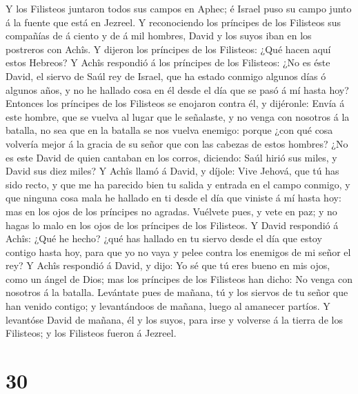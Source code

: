  Y los Filisteos juntaron todos sus campos en Aphec; é
Israel puso su campo junto á la fuente que está en Jezreel. 
Y reconociendo los príncipes de los Filisteos sus compañías de á ciento
y de á mil hombres, David y los suyos iban en los postreros con Achîs.
 Y dijeron los príncipes de los Filisteos: ¿Qué hacen aquí
estos Hebreos? Y Achîs respondió á los príncipes de los Filisteos: ¿No
es éste David, el siervo de Saúl rey de Israel, que ha estado conmigo
algunos días ó algunos años, y no he hallado cosa en él desde el día que
se pasó á mí hasta hoy?  Entonces los príncipes de los
Filisteos se enojaron contra él, y dijéronle: Envía á este hombre, que
se vuelva al lugar que le señalaste, y no venga con nosotros á la
batalla, no sea que en la batalla se nos vuelva enemigo: porque ¿con qué
cosa volvería mejor á la gracia de su señor que con las cabezas de estos
hombres?  ¿No es este David de quien cantaban en los corros,
diciendo: Saúl hirió sus miles, y David sus diez miles?  Y
Achîs llamó á David, y díjole: Vive Jehová, que tú has sido recto, y que
me ha parecido bien tu salida y entrada en el campo conmigo, y que
ninguna cosa mala he hallado en ti desde el día que viniste á mí hasta
hoy: mas en los ojos de los príncipes no agradas.  Vuélvete
pues, y vete en paz; y no hagas lo malo en los ojos de los príncipes de
los Filisteos.  Y David respondió á Achîs: ¿Qué he hecho?
¿qué has hallado en tu siervo desde el día que estoy contigo hasta hoy,
para que yo no vaya y pelee contra los enemigos de mi señor el rey?
 Y Achîs respondió á David, y dijo: Yo sé que tú eres bueno
en mis ojos, como un ángel de Dios; mas los príncipes de los Filisteos
han dicho: No venga con nosotros á la batalla.  Levántate
pues de mañana, tú y los siervos de tu señor que han venido contigo; y
levantándoos de mañana, luego al amanecer partíos.  Y
levantóse David de mañana, él y los suyos, para irse y volverse á la
tierra de los Filisteos; y los Filisteos fueron á Jezreel.

\hypertarget{section-29}{%
\section{30}\label{section-29}}

